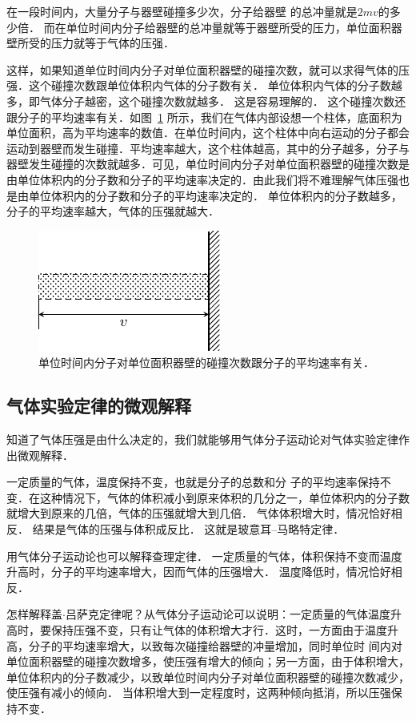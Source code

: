 在一段时间内，大量分子与器壁碰撞多少次，分子给器壁
的总冲量就是$2mv$的多少倍．
而在单位时间内分子给器壁的总冲量就等于器壁所受的压力，单位面积器壁所受的压力就等于气体的压强．

这样，如果知道单位时间内分子对单位面积器壁的碰撞次数，就可以求得气体的压强．这个碰撞次数跟单位体积内气体的分子数有关．
单位体积内气体的分子数越多，即气体分子越密，这个碰撞次数就越多．
这是容易理解的．
这个碰撞次数还跟分子的平均速率有关．如图~\ref{fig_B_3-15} 所示，我们在气体内部设想一个柱体，底面积为单位面积，高为平均速率的数值．在单位时间内，这个柱体中向右运动的分子都会运动到器壁而发生碰撞．平均速率越大，这个柱体越高，其中的分子越多，分子与器壁发生碰撞的次数就越多．可见，单位时间内分子对单位面积器壁的碰撞次数是由单位体积内的分子数和分子的平均速率决定的．由此我们将不难理解气体压强也是由单位体积内的分子数和分子的平均速率决定的．
单位体积内的分子数越多，分子的平均速率越大，气体的压强就越大．
\begin{figure}[htbp]
    \centering
    \includegraphics{fig/B/3-15.pdf}
    \caption{单位时间内分子对单位面积器壁的碰撞次数跟分子的平均速率有关．}\label{fig_B_3-15}
\end{figure}

\subsection{气体实验定律的微观解释} 
知道了气体压强是由什么决定的，我们就能够用气体分子运动论对气体实验定律作出微观解释．

一定质量的气体，温度保持不变，也就是分子的总数和分
子的平均速率保持不变．在这种情况下，气体的体积减小到原来体积的几分之一，单位体积内的分子数就增大到原来的几倍，气体的压强就增大到几倍．
气体体积增大时，情况恰好相反．
结果是气体的压强与体积成反比．
这就是玻意耳--马略特定律．

用气体分子运动论也可以解释查理定律．
一定质量的气体，体积保持不变而温度升高时，分子的平均速率增大，因而气体的压强增大．
温度降低时，情况恰好相反．

怎样解释盖$\cdot$吕萨克定律呢？从气体分子运动论可以说明：一定质量的气体温度升高时，要保持压强不变，只有让气体的体积增大才行．这时，一方面由于温度升高，分子的平均速率增大，以致每次碰撞给器壁的冲量增加，同时单位时
间内对单位面积器壁的碰撞次数增多，使压强有增大的倾向；另一方面，由于体积增大，单位体积内的分子数减少，以致单位时间内分子对单位面积器壁的碰撞次数减少，使压强有减小的倾向．
当体积增大到一定程度时，这两种倾向抵消，所以压强保持不变．

